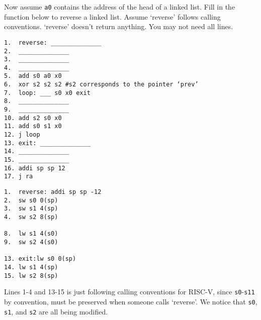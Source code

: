 \begin{blocksection}
\question
Now assume \lstinline$a0$ contains the address of the head of a linked list.  Fill in the function 
below to reverse a linked list. Assume ‘reverse’ follows calling conventions. ‘reverse’ doesn’t return anything. You may not need all lines. 

\begin{verbatim}
1.  reverse: ______________
2.  ______________
3.  ______________
4.  ______________
5.  add s0 a0 x0 
6.  xor s2 s2 s2 #s2 corresponds to the pointer ‘prev’ 
7.  loop: ___ s0 x0 exit
8.  ______________
9.  ______________
10. add s2 s0 x0 
11. add s0 s1 x0 
12. j loop 
13. exit: ______________
14. ______________
15. ______________
16. addi sp sp 12
17. j ra
\end{verbatim}

\begin{solution}[4in]
\begin{verbatim}
1.  reverse: addi sp sp -12
2.  sw s0 0(sp) 
3.  sw s1 4(sp) 
4.  sw s2 8(sp) 

8.  lw s1 4(s0)
9.  sw s2 4(s0)

13. exit:lw s0 0(sp)
14. lw s1 4(sp)
15. lw s2 8(sp)
\end{verbatim}

Lines 1-4 and 13-15 is just following calling conventions for RISC-V, since \lstinline$s0$-\lstinline$s11$ by convention, must be preserved when someone calls ‘reverse’. We notice that \lstinline$s0$, \lstinline$s1$, and \lstinline$s2$ are all being modified.

\end{solution}
\end{blocksection}